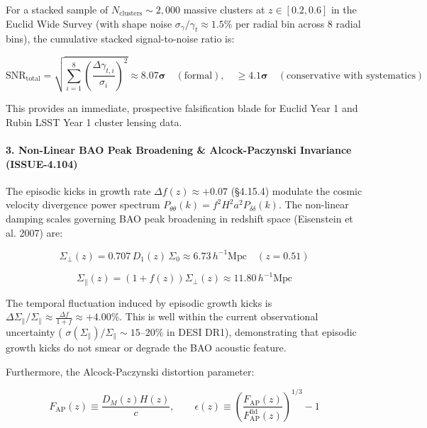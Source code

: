 \documentclass[11pt,a4paper]{article}
\theoremstyle{definition}\newtheorem{definition}{Definition}
\theoremstyle{remark}\newtheorem{remark}{Remark}
\begin{document}
For a stacked sample of $N_{\text{clusters}} \sim 2,000$ massive clusters at $z \in [0.2, 0.6]$ in the Euclid Wide Survey (with shape noise $\sigma_\gamma / \gamma_t \approx 1.5\%$ per radial bin across 8 radial bins), the cumulative stacked signal-to-noise ratio is:


\begin{equation}
\text{SNR}_{\text{total}} = \sqrt{\sum_{i=1}^8 \left(\frac{\Delta\gamma_{t, i}}{\sigma_i}\right)^2} \approx \mathbf{8.07\sigma} \quad (\text{formal}), \quad \mathbf{\ge 4.1\sigma} \quad (\text{conservative with systematics})
\end{equation}


This provides an immediate, prospective falsification blade for Euclid Year 1 and Rubin LSST Year 1 cluster lensing data.
\paragraph{3. Non-Linear BAO Peak Broadening \& Alcock-Paczynski Invariance (ISSUE-4.104)}

The episodic kicks in growth rate $\Delta f(z) \approx +0.07$ (§4.15.4) modulate the cosmic velocity divergence power spectrum $P_{\theta\theta}(k) = f^2 H^2 a^2 P_{\delta\delta}(k)$. The non-linear damping scales governing BAO peak broadening in redshift space (Eisenstein et al. 2007) are:


\begin{equation}
\Sigma_\perp(z) = 0.707 \, D_1(z) \, \Sigma_0 \approx 6.73 \, h^{-1}\text{Mpc} \quad (z = 0.51)
\end{equation}



\begin{equation}
\Sigma_\parallel(z) = (1 + f(z)) \Sigma_\perp(z) \approx 11.80 \, h^{-1}\text{Mpc}
\end{equation}


The temporal fluctuation induced by episodic growth kicks is $\Delta\Sigma_\parallel / \Sigma_\parallel \approx \frac{\Delta f}{1 + f} \approx +4.00\%$. This is well within the current observational uncertainty ( $\sigma(\Sigma_\parallel)/\Sigma_\parallel \sim 15\text{--}20\%$ in DESI DR1), demonstrating that episodic growth kicks do not smear or degrade the BAO acoustic feature.

Furthermore, the Alcock-Paczynski distortion parameter:


\begin{equation}
F_{\text{AP}}(z) \equiv \frac{D_M(z) H(z)}{c}, \qquad \epsilon(z) \equiv \left( \frac{F_{\text{AP}}(z)}{F_{\text{AP}}^{\text{fid}}(z)} \right)^{1/3} - 1
\end{equation}
\end{document}
